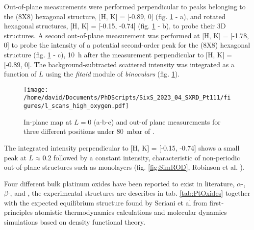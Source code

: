 Out-of-plane measurements were performed perpendicular to peaks belonging to the (8X8) hexagonal structure, [H, K] = [-0.89, 0] (fig. \ref{fig:LScans80} - a), and rotated hexagonal structures, [H, K] = [-0.15, -0.74] (fig. \ref{fig:LScans80} - b), to probe their 3D structures.
A second out-of-plane measurement was performed at [H, K] = [-1.78, 0] to probe the intensity of a potential second-order peak for the (8X8) hexagonal structure (fig. \ref{fig:LScans80} - c), \qty{10}{\hour} after the measurement perpendicular to [H, K] = [-0.89, 0].
The background-subtracted scattered intensity was integrated as a function of $L$ using the \textit{fitaid} module of \textit{binoculars} (fig. \ref{fig:LScans80}).

\begin{figure}[!htb]
    \centering
    \texttt{[image: /home/david/Documents/PhDScripts/SixS\_2023\_04\_SXRD\_Pt111/figures/l\_scans\_high\_oxygen.pdf]}
    \caption{
        In-plane map at $L=0$ (a-b-c) and out-of plane measurements for three different positions under \qty{80}{\milli\bar} of .
    }
    \label{fig:LScans80}
\end{figure}

The integrated intensity perpendicular to [H, K] = [-0.15, -0.74] shows a small peak at $L\approx 0.2$ followed by a constant intensity, characteristic of non-periodic out-of-plane structures such as monolayers (fig. \ref{fig:SimROD}, Robinson et al. \cite*{Robinson1991}).

Four different bulk platinum oxides have been reported to exist in literature, $\alpha$-, $\beta$-,  and , the experimental structures are describes in tab. \ref{tab:PtOxides} together with the expected equilibrium structure found by Seriani et al \parencite*{Seriani2006, Seriani2008} from first-principles atomistic thermodynamics calculations and molecular dynamics simulations based on density functional theory.


